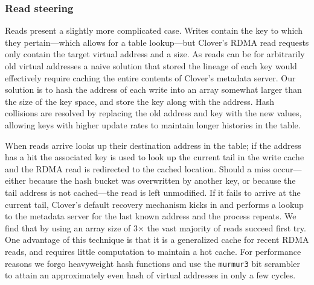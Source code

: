 
\subsubsection{Read steering}

Reads present a slightly more complicated case. Writes contain the key
to which they pertain---which allows for a table lookup---but Clover's
RDMA read requests only contain the target virtual address and a size.
As reads can be for arbitrarily old virtual addresses a naive solution
that stored the lineage of each key would effectively require
caching the entire contents of Clover's metadata server.  Our solution
is to hash the address of each write into an array somewhat larger than
the size of the key space, and store the key along with the address.
Hash collisions are resolved by replacing the old address and key with
the new values, allowing keys with higher update rates to maintain
longer histories in the table. 

When reads arrive {\sword} looks up their destination address in the
table; if the address has a hit the associated key is used to look up
the current tail in the write cache and the RDMA read is redirected to
the cached location.  Should a miss occur---either because the hash
bucket was overwritten by another key, or because the tail address is
not cached---the read is left unmodified.  If it fails to arrive at
the current tail, Clover's default recovery mechanism kicks in and
performs a lookup to the metadata server for the last known address
and the process repeats. We find that by using an array size of
3$\times$ the vast majority of reads succeed first try. One advantage
of this technique is that it is a generalized cache for recent RDMA
reads, and requires little computation to maintain a hot cache. For
performance reasons we forgo heavyweight hash functions and use
the \texttt{murmur3} bit scrambler to attain an approximately even
hash of virtual addresses in only a few cycles.

